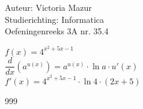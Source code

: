 \documentclass[a4paper]{article}
\begin{document}
\noindent \large Auteur: Victoria Mazur \\
\noindent \large Studierichting: Informatica \\
\noindent \large Oefeningenreeks 3A nr. 35.4 \\

\medskip

\normalsize

$f(x) = 4^{x^2 + 5x - 1}$\\

$\dfrac{d}{dx} (a^{u(x)}) = a^{u(x)} \cdot \ln a \cdot u'(x)$\\

$f'(x) = 4^{x^2 + 5x - 1} \cdot \ln 4 \cdot (2x + 5)$



\begin{thebibliography}{999}
\end{thebibliography}
\end{document}
